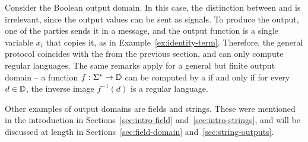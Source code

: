 \begin{myexample}
    Consider the Boolean output domain. In this case, the distinction between
     and  is irrelevant, since the output values
    can be sent as signals. To produce the output, one of the parties sends it in a message, and the output function is a single variable $x_i$ that copies it, as in Example~\ref{ex:identity-term}. Therefore, the general protocol coincides with the
     from the previous section, and  can only compute regular
    languages.  The same remarks apply for a general but finite output domain
    -- a function $f : \Sigma^* \to \mathbb D$ can be computed by a  if
    and only if for every $d \in \mathbb D$, the inverse image $f^{-1}(d)$ is a
    regular language.
\end{myexample}

Other examples of output domains are fields and strings. These were mentioned in the introduction in Sections~\ref{sec:intro-field}
and~\ref{sec:intro-strings},  and will be discussed at length in
Sections~\ref{sec:field-domain} and~\ref{sec:string-outputs}.  




